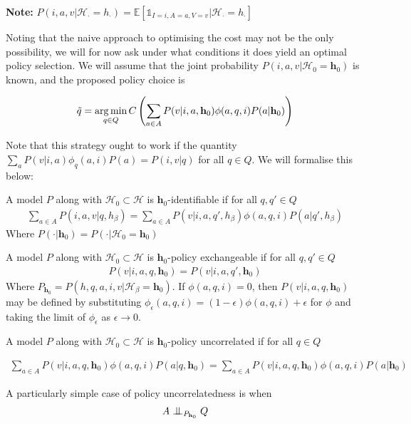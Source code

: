 \textbf{Note: } $P(i,a,v|\mathcal{H}_\cdot=h_\cdot)=\mathbb{E}[\mathds{1}_{I=i,A=a,V=v}|\mathcal{H}_\cdot=h_\cdot]$

Noting that the naive approach to optimising the cost may not be the only possibility, we will for now ask under what conditions it does yield an optimal policy selection. We will assume that the joint probability $P(i,a,v|\mathcal{H}_0=\mathbf{h}_0)$ is known, and the proposed policy choice is

\begin{align}
    \tilde{q} = \operatorname*{arg\,min}_{q\in Q} C \left( \sum_{a\in A} P(v|i,a,\mathbf{h}_0) \phi(a,q,i) P(a|\mathbf{h}_0)\right)
\end{align}

Note that this strategy ought to work if the quantity $\sum_a P(v|i,a) \phi_q(a,i) P(a) = P(i,v|q)$ for all $q\in Q$. We will formalise this below:

\begin{definition}
A model $P$ along with $\mathcal{H}_0\subset\mathcal{H}$ is $\mathbf{h}_0$-identifiable if for all $q,q'\in Q$
\begin{align}
    \sum_{a\in A} P(i,a,v|q,h_\beta)=\sum_{a\in A} P(v|i,a,q',h_\beta) \phi(a,q,i) P(a|q',h_\beta) 
\end{align}
Where $P(\cdot | \mathbf{h}_0)=P(\cdot | \mathcal{H}_0 = \mathbf{h}_0)$
\end{definition}

\begin{definition}
A model $P$ along with $\mathcal{H}_0\subset\mathcal{H}$ is $\mathbf{h}_0$-policy exchangeable if for all $q,q'\in Q$
\begin{align}
    P(v|i,a,q,\mathbf{h}_0) = P(v|i,a,q',\mathbf{h}_0)
\end{align}
Where $P_{\mathbf{h}_0}=P(h,q,a,i,v|\mathcal{H}_\beta=\mathbf{h}_0)$. If $\phi(a,q,i)=0$, then $P(v|i,a,q,\mathbf{h}_0)$ may be defined by substituting $\phi_{\epsilon}(a,q,i) = (1-\epsilon)\phi(a,q,i) + \epsilon$ for $\phi$ and taking the limit of $\phi_{\epsilon}$ as $\epsilon \to 0$.
\end{definition}

\begin{definition}
A model $P$ along with $\mathcal{H}_0\subset\mathcal{H}$ is $\mathbf{h}_0$-policy uncorrelated if for all $q\in Q$

\begin{align}
    \sum_{a\in A} P(v|i,a,q,\mathbf{h}_0)\phi(a,q,i) P(a|q,\mathbf{h}_0) = \sum_{a\in A} P(v|i,a,q,\mathbf{h}_0)\phi(a,q,i) P(a|\mathbf{h}_0)
\end{align}

A particularly simple case of policy uncorrelatedness is when
\begin{align}
    A\CI_{P_{\mathbf{h}_0}} Q
\end{align}
\end{definition}

